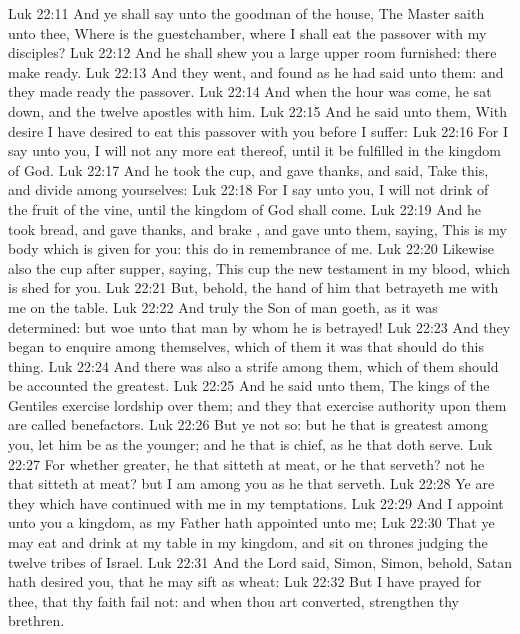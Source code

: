 \vs Luk 22:11 And ye shall say unto the goodman of the house, The Master saith unto thee, Where is the guestchamber, where I shall eat the passover with my disciples?
\vs Luk 22:12 And he shall shew you a large upper room furnished: there make ready.
\vs Luk 22:13 And they went, and found as he had said unto them: and they made ready the passover.
\vs Luk 22:14 And when the hour was come, he sat down, and the twelve apostles with him.
\vs Luk 22:15 And he said unto them, With desire I have desired to eat this passover with you before I suffer:
\vs Luk 22:16 For I say unto you, I will not any more eat thereof, until it be fulfilled in the kingdom of God.
\vs Luk 22:17 And he took the cup, and gave thanks, and said, Take this, and divide  among yourselves:
\vs Luk 22:18 For I say unto you, I will not drink of the fruit of the vine, until the kingdom of God shall come.
\vs Luk 22:19 And he took bread, and gave thanks, and brake , and gave unto them, saying, This is my body which is given for you: this do in remembrance of me.
\vs Luk 22:20 Likewise also the cup after supper, saying, This cup  the new testament in my blood, which is shed for you.
\vs Luk 22:21 But, behold, the hand of him that betrayeth me  with me on the table.
\vs Luk 22:22 And truly the Son of man goeth, as it was determined: but woe unto that man by whom he is betrayed!
\vs Luk 22:23 And they began to enquire among themselves, which of them it was that should do this thing.
\vs Luk 22:24 And there was also a strife among them, which of them should be accounted the greatest.
\vs Luk 22:25 And he said unto them, The kings of the Gentiles exercise lordship over them; and they that exercise authority upon them are called benefactors.
\vs Luk 22:26 But ye  not  so: but he that is greatest among you, let him be as the younger; and he that is chief, as he that doth serve.
\vs Luk 22:27 For whether  greater, he that sitteth at meat, or he that serveth?  not he that sitteth at meat? but I am among you as he that serveth.
\vs Luk 22:28 Ye are they which have continued with me in my temptations.
\vs Luk 22:29 And I appoint unto you a kingdom, as my Father hath appointed unto me;
\vs Luk 22:30 That ye may eat and drink at my table in my kingdom, and sit on thrones judging the twelve tribes of Israel.
\vs Luk 22:31 And the Lord said, Simon, Simon, behold, Satan hath desired  you, that he may sift  as wheat:
\vs Luk 22:32 But I have prayed for thee, that thy faith fail not: and when thou art converted, strengthen thy brethren.
